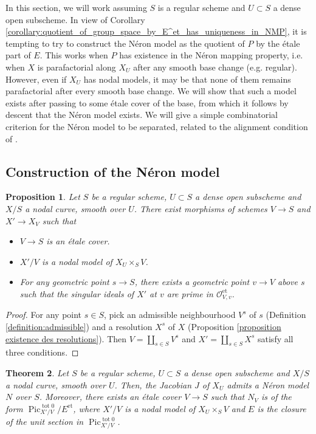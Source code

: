 \documentclass[a4paper,10pt,twoside]{article}
\newcommand{\on}[1]{\operatorname{#1}}
\renewcommand{\O}{\mathcal{O}}
\DeclareMathOperator{\pic}{Pic}
\newtheorem{thm}{Theorem}[section]
\newtheorem{prop}[thm]{Proposition}
\theoremstyle{definition}
\theoremstyle{remark}
\renewcommand{\on}[1]{\operatorname{#1}}
\begin{document}
In this section, we will work assuming $S$ is a regular scheme and $U\subset S$ a dense open subscheme. In view of Corollary \ref{corollary:quotient_of_group_space_by_E^et_has_uniqueness_in_NMP}, it is tempting to try to construct the Néron model as the quotient of $P$ by the étale part of $E$. This works when $P$ has existence in the Néron mapping property, i.e. when $X$ is parafactorial along $X_U$ after any smooth base change (e.g. regular). However, even if $X_U$ has nodal models, it may be that none of them remains parafactorial after every smooth base change. We will show that such a model exists after passing to some étale cover of the base, from which it follows by descent that the Néron model exists. We will give a simple combinatorial criterion for the Néron model to be separated, related to the alignment condition of \cite{Holmes}.


\subsection{Construction of the Néron model}



\begin{prop}\label{proposition:nodal_curves_have_quasi_resolutions}
Let $S$ be a regular scheme, $U\subset S$ a dense open subscheme and $X/S$ a nodal curve, smooth over $U$. There exist morphisms of schemes $V \to S$ and $X'\to X_V$ such that
\begin{itemize}
\item $V \to S$ is an étale cover.
\item $X'/V$ is a nodal model of $X_U\times_S V$.
\item For any geometric point $s \to S$, there exists a geometric point $v \to V$ above $s$ such that the singular ideals of $X'$ at $v$ are prime in $\O_{V,v}^{\on{et}}$.
\end{itemize}
\end{prop}

\begin{proof}
For any point $s\in S$, pick an admissible neighbourhood $V^s$ of $s$ (Definition \ref{definition:admissible}) and a resolution $X^s$ of $X$ (Proposition \ref{proposition existence des resolutions}). Then $V=\coprod\limits_{s\in S} V^s$ and $X'=\coprod\limits_{s\in S} X^s$ satisfy all three conditions.
\end{proof}

\begin{thm}\label{theorem:NMs_of_jacobians}
Let $S$ be a regular scheme, $U\subset S$ a dense open subscheme and $X/S$ a nodal curve, smooth over $U$. Then, the Jacobian $J$ of $X_U$ admits a Néron model $N$ over $S$. Moreover, there exists an étale cover $V \to S$ such that $N_V$ is of the form $\pic^{\on{tot}0}_{X'/V}/E^{\on{et}}$, where $X'/V$ is a nodal model of $X_U\times_S V$ and $E$ is the closure of the unit section in $\pic^{\on{tot}0}_{X'/V}$.
\end{thm}
\end{document}

